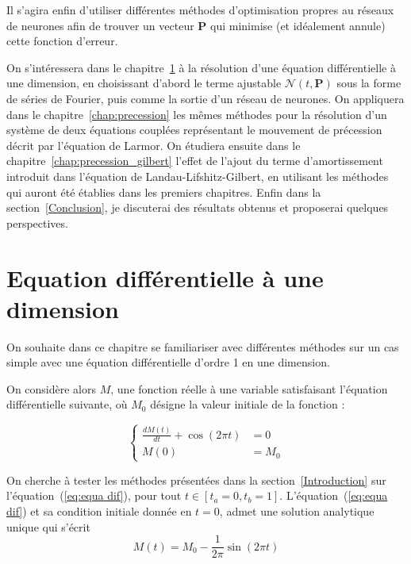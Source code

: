 \documentclass[12pt]{report}
\begin{document}
Il s'agira enfin d'utiliser différentes méthodes d'optimisation propres au réseaux de neurones afin de trouver un vecteur $\bm P$ qui minimise (et idéalement annule) cette fonction d'erreur.

On s'intéressera dans le chapitre~\ref{chap:ode_1} à la résolution d'une équation différentielle à une dimension, en choisissant d'abord le terme ajustable $\mathcal{N}(t,\bm{P})$ sous la forme de séries de Fourier, puis comme la sortie d'un réseau de neurones.
On appliquera dans le chapitre~\ref{chap:precession} les mêmes méthodes pour la résolution d'un système de deux équations couplées représentant le mouvement de précession décrit par l'équation de Larmor.
On étudiera ensuite dans le chapitre~\ref{chap:precession_gilbert} l'effet de l'ajout du terme d'amortissement introduit dans l'équation de Landau-Lifshitz-Gilbert, en utilisant les méthodes qui auront été établies dans les premiers chapitres.
Enfin dans la section~\ref{Conclusion}, je discuterai des résultats obtenus et proposerai quelques perspectives.


\chapter{Equation différentielle à une dimension}
\label{chap:ode_1}

On souhaite dans ce chapitre se familiariser avec différentes méthodes sur un cas simple avec une équation différentielle d'ordre 1 en une dimension.

On considère alors $M$, une fonction réelle à une variable satisfaisant l'équation différentielle suivante, où $M_0$ désigne la valeur initiale de la fonction :

\begin{equation}
\left\{
    \begin{aligned}
        \frac{dM(t)}{dt} + \cos(2\pi t) &= 0 \\
        M(0) &= M_0
    \end{aligned}
\right.
\label{eq:equa dif}
\end{equation}

On cherche à tester les méthodes présentées dans la section~\ref{Introduction} sur l'équation~(\ref{eq:equa dif}), pour tout $t\in [t_a=0,t_b=1]$.
L'équation~(\ref{eq:equa dif}) et sa condition initiale donnée en $t=0$, admet une solution analytique unique qui s'écrit
\begin{equation}
    {M}(t) = M_0 - \frac{1}{2\pi}\sin(2\pi t)
    \label{eq:solution analytique}
\end{equation}
\end{document}
